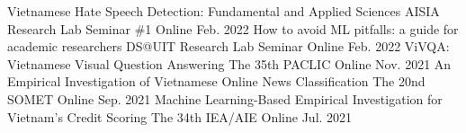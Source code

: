 

    
\begin{cvhonors}
  \cvhonor
    {Vietnamese Hate Speech Detection: Fundamental and Applied Sciences} %
    {AISIA Research Lab Seminar \#1} %
    {Online}
    {Feb. 2022} %
  \cvhonor
    {How to avoid ML pitfalls: a guide for academic researchers} %
    {DS@UIT Research Lab Seminar} %
    {Online}
    {Feb. 2022} %
  \cvhonor
    {ViVQA: Vietnamese Visual Question Answering} %
    {The 35th PACLIC} %
    {Online}
    {Nov. 2021} %
  \cvhonor
    {An Empirical Investigation of Vietnamese Online News Classification} %
    {The 20nd SOMET} %
    {Online}
    {Sep. 2021} %
  \cvhonor
    {Machine Learning-Based Empirical Investigation for Vietnam’s Credit Scoring} %
    {The 34th IEA/AIE} %
    {Online}
    {Jul. 2021} %
\end{cvhonors}





